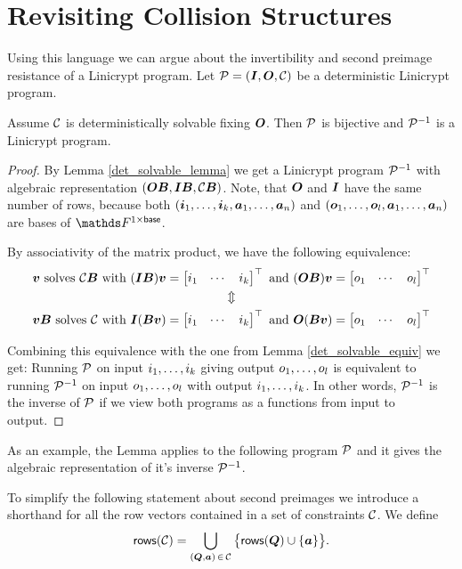 \section{Revisiting Collision Structures}

Using this language we can argue about the invertibility and second preimage resistance of a Linicrypt program.
Let $\P = (\I, \O, \C)$ be a deterministic Linicrypt program.

\begin{lemma}
\label{inversion}
    Assume $\C$ is deterministically solvable fixing $\O$. Then $\P$ is bijective and $\P^{-1}$ is a Linicrypt program.
\end{lemma}

\begin{proof}
By Lemma \ref{det_solvable_lemma} we get a Linicrypt program $\P^{-1}$ with algebraic representation $(\O \B, \I \B, \C \B)$.
Note, that $\O$ and $\I$ have the same number of rows, because both $(\dts\vi k, \dts \va n)$ and
$(\dts\vo l, \dts \va n)$ are bases of $\F^{1\times\base}$.

By associativity of the matrix product, we have the following equivalence:
\begin{gather*}
    \vv \textrm{ solves } \C \B \textrm{ with } (\I \B) \vv = \mtdts i k \textrm{ and } (\O \B) \vv = \mtdts o l \\
    \Updownarrow \\
    \vv \B \textrm{ solves } \C \textrm{ with } \I (\B \vv) = \mtdts i k \textrm{ and } \O (\B \vv) = \mtdts o l 
\end{gather*}

Combining this equivalence with the one from Lemma \ref{det_solvable_equiv} we get:
Running $\P$ on input $\dts i k$ giving output $\dts o l$ is equivalent to running 
$\P^{-1}$ on input $\dts o l$ with output $\dts i k$.
In other words, $\P^{-1}$ is the inverse of $\P$ if we view both programs as a functions from input to output.
\end{proof}

As an example, the Lemma applies to the following program $\P$ 
and it gives the algebraic representation of it's inverse $\P^{-1}$.
\begin{pchstack}[center,space=2cm]
\end{pchstack}

To simplify the following statement about second preimages we introduce a shorthand for all the row vectors contained in a set of constraints $\C$.
We define \[
\rows(\C) = \bigcup_{(\Q,\va) \, \in \, \C} \big\{ \rows(\Q) \cup \{ \va \} \big\}.
\]

